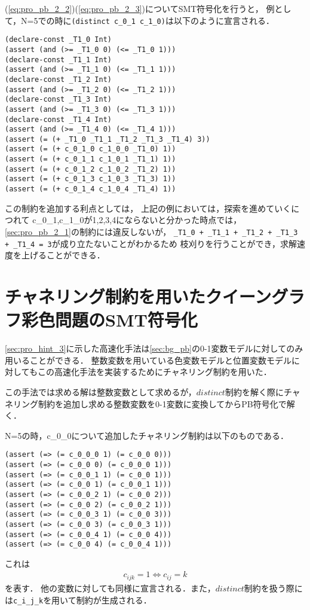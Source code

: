 (\ref{eq:pro_pb_2_2})(\ref{eq:pro_pb_2_3})についてSMT符号化を行うと，
例として，N=5での時に\verb|(distinct c_0_1 c_1_0)|は以下のように宣言される．

\begin{verbatim}
(declare-const _T1_0 Int)
(assert (and (>= _T1_0 0) (<= _T1_0 1)))
(declare-const _T1_1 Int)
(assert (and (>= _T1_1 0) (<= _T1_1 1)))
(declare-const _T1_2 Int)
(assert (and (>= _T1_2 0) (<= _T1_2 1)))
(declare-const _T1_3 Int)
(assert (and (>= _T1_3 0) (<= _T1_3 1)))
(declare-const _T1_4 Int)
(assert (and (>= _T1_4 0) (<= _T1_4 1)))
(assert (= (+ _T1_0 _T1_1 _T1_2 _T1_3 _T1_4) 3))
(assert (= (+ c_0_1_0 c_1_0_0 _T1_0) 1))
(assert (= (+ c_0_1_1 c_1_0_1 _T1_1) 1))
(assert (= (+ c_0_1_2 c_1_0_2 _T1_2) 1))
(assert (= (+ c_0_1_3 c_1_0_3 _T1_3) 1))
(assert (= (+ c_0_1_4 c_1_0_4 _T1_4) 1))
\end{verbatim}

この制約を追加する利点としては，
上記の例においては，探索を進めていくにつれて
c\_0\_1,c\_1\_0が1,2,3,4にならないと分かった時点では，\ref{sec:pro_pb_2_1}の制約には違反しないが，
\verb|_T1_0 + _T1_1 + _T1_2 + _T1_3 + _T1_4 = 3|が成り立たないことがわかるため
枝刈りを行うことができ，求解速度を上げることができる．



%
%
\section{チャネリング制約を用いたクイーングラフ彩色問題のSMT符号化}\label{sec:pro_pb_c}
\ref{sec:pro_hint_3}に示した高速化手法は\ref{sec:bg_pb}の0-1変数モデルに対してのみ用いることができる．
整数変数を用いている色変数モデルと位置変数モデルに対してもこの高速化手法を実装するためにチャネリング制約を用いた．

この手法では求める解は整数変数として求めるが，$distinct$制約を解く際にチャネリング制約を追加し求める整数変数を0-1変数に変換してからPB符号化で解く．

N=5の時，c\_0\_0について追加したチャネリング制約は以下のものである．
\begin{verbatim}
(assert (=> (= c_0_0_0 1) (= c_0_0 0)))
(assert (=> (= c_0_0 0) (= c_0_0_0 1)))
(assert (=> (= c_0_0_1 1) (= c_0_0 1)))
(assert (=> (= c_0_0 1) (= c_0_0_1 1)))
(assert (=> (= c_0_0_2 1) (= c_0_0 2)))
(assert (=> (= c_0_0 2) (= c_0_0_2 1)))
(assert (=> (= c_0_0_3 1) (= c_0_0 3)))
(assert (=> (= c_0_0 3) (= c_0_0_3 1)))
(assert (=> (= c_0_0_4 1) (= c_0_0 4)))
(assert (=> (= c_0_0 4) (= c_0_0_4 1)))
\end{verbatim}
これは
\begin{eqnarray}
    c_{ijk} = 1 \Leftrightarrow c_{ij} = k
\end{eqnarray}
を表す．
他の変数に対しても同様に宣言される．また，$distinct$制約を扱う際には\verb|c_i_j_k|を用いて制約が生成される．



